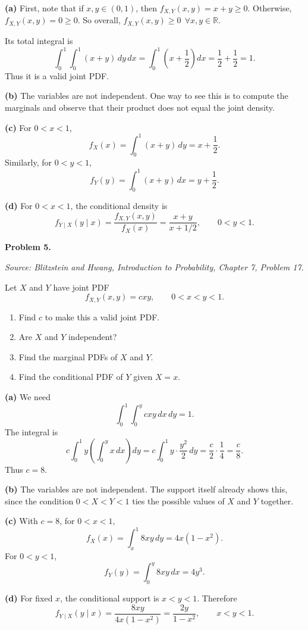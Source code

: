 \documentclass[11pt]{article}
\newcommand{\source}[2]{%
    \vspace{0.15cm}
    {\small\textit{Source: Blitzstein and Hwang, \textit{Introduction to Probability}, Chapter #1, Problem #2.}}
}
\begin{document}
\begin{solutionbox}
\textbf{(a)} First, note that if $x,y \in (0,1)$, then $f_{X,Y}(x,y) = x+y\geq 0$. Otherwise, $f_{X,Y}(x,y) = 0\geq 0$. So overall, $f_{X,Y}(x,y)\geq0 \ \ \forall x,y\in \mathbb{R}$.


Its total integral is
\[
\int_0^1\int_0^1 (x+y)\,dy\,dx
=
\int_0^1\left(x+\frac12\right)dx
=\frac12+\frac12=1.
\]
Thus it is a valid joint PDF.
 

\textbf{(b)} The variables are not independent. One way to see this is to compute the marginals and observe that their product does not equal the joint density.
 

\textbf{(c)} For \(0<x<1\),
\[
f_X(x)=\int_0^1 (x+y)\,dy=x+\frac12.
\]
Similarly, for \(0<y<1\),
\[
f_Y(y)=\int_0^1 (x+y)\,dx=y+\frac12.
\]
 

\textbf{(d)} For \(0<x<1\), the conditional density is
\[
f_{Y\mid X}(y\mid x)
=\frac{f_{X,Y}(x,y)}{f_X(x)}
=\frac{x+y}{x+1/2},
\qquad 0<y<1.
\]
 
\end{solutionbox}
\newpage


\begin{problemheader}
\textbf{Problem 5. }
\end{problemheader}
\source{7}{17}

Let $X$ and $Y$ have joint PDF
\[
f_{X,Y}(x,y)=cxy,\qquad 0<x<y<1.
\]

\begin{enumerate}[label=(\alph*), leftmargin=*]
    \item Find $c$ to make this a valid joint PDF.

    \item Are $X$ and $Y$ independent?

    \item Find the marginal PDFs of $X$ and $Y$.

    \item Find the conditional PDF of $Y$ given $X=x$.
\end{enumerate}

\begin{solutionbox}
\textbf{(a)} We need
\[
\int_0^1\int_0^y cxy\,dx\,dy=1.
\]
The integral is
\[
c\int_0^1 y\left(\int_0^y x\,dx\right)dy
=
c\int_0^1 y\cdot \frac{y^2}{2}\,dy
=
\frac{c}{2}\cdot \frac14
=
\frac{c}{8}.
\]
Thus \(c=8\).
 

\textbf{(b)} The variables are not independent. The support itself already shows this, since the condition \(0<X<Y<1\) ties the possible values of \(X\) and \(Y\) together.
 

\textbf{(c)} With \(c=8\), for \(0<x<1\),
\[
f_X(x)=\int_x^1 8xy\,dy=4x(1-x^2).
\]
For \(0<y<1\),
\[
f_Y(y)=\int_0^y 8xy\,dx=4y^3.
\]
 

\textbf{(d)} For fixed \(x\), the conditional support is \(x<y<1\). Therefore
\[
f_{Y\mid X}(y\mid x)
=\frac{8xy}{4x(1-x^2)}
=\frac{2y}{1-x^2},
\qquad x<y<1.
\]
 
\end{solutionbox}
\newpage
\end{document}
